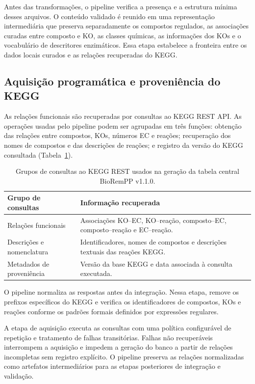 Antes das transformações, o pipeline verifica a presença e a estrutura mínima desses arquivos. O conteúdo validado é reunido em uma representação intermediária que preserva separadamente os compostos regulados, as associações curadas entre composto e KO, as classes químicas, as informações dos KOs e o vocabulário de descritores enzimáticos. Essa etapa estabelece a fronteira entre os dados locais curados e as relações recuperadas do KEGG.

\subsection{Aquisição programática e proveniência do KEGG}

As relações funcionais são recuperadas por consultas ao KEGG REST API. As operações usadas pelo pipeline podem ser agrupadas em três funções: obtenção das relações entre compostos, KOs, números EC e reações; recuperação dos nomes de compostos e das descrições de reações; e registro da versão do KEGG consultada (Tabela~\ref{tab:c1-kegg-endpoints}).

\begin{table}[htbp]
\centering
\caption{Grupos de consultas ao KEGG REST usados na geração da tabela central BioRemPP v1.1.0.}
\label{tab:c1-kegg-endpoints}
\small
\begin{tabularx}{\textwidth}{@{}lX@{}}
\toprule
\textbf{Grupo de consultas} & \textbf{Informação recuperada} \\
\midrule
Relações funcionais
& Associações KO--EC, KO--reação, composto--EC, composto--reação e EC--reação. \\

Descrições e nomenclatura
& Identificadores, nomes de compostos e descrições textuais das reações KEGG. \\

Metadados de proveniência
& Versão da base KEGG e data associada à consulta executada. \\
\bottomrule
\end{tabularx}
\end{table}

O pipeline normaliza as respostas antes da integração. Nessa etapa, remove os
prefixos específicos do KEGG e verifica os identificadores de compostos, KOs e
reações conforme os padrões formais definidos por expressões regulares.

A etapa de aquisição executa as consultas com uma política configurável de
repetição e tratamento de falhas transitórias. Falhas não recuperáveis
interrompem a aquisição e impedem a geração do banco a partir de relações
incompletas sem registro explícito. O pipeline preserva as relações
normalizadas como artefatos intermediários para as etapas posteriores de
integração e validação.

